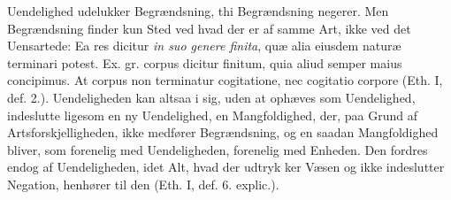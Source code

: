 \documentclass[12pt,a4paper]{book}
\newcommand{\opage}[1]{\marginnote{\footnotesize\textit{[#1]}}}
\begin{document}
Uendelighed udelukker Begrændsning, thi Begrændsning negerer. Men
Begrændsning finder kun Sted ved hvad der er af samme Art, ikke ved det
Uensartede: Ea res dicitur \emph{in suo genere finita}, quæ alia
eiusdem naturæ terminari potest. Ex. gr. corpus dicitur finitum, quia
aliud semper maius concipimus. At corpus non terminatur cogitatione,
nec cogitatio corpore (Eth. I, def. 2.). Uendeligheden kan altsaa i
sig, uden at ophæves som Uendelighed, indeslutte ligesom en ny
Uendelighed, en Mangfoldighed, der, paa Grund af Artsforskjelligheden,
ikke medfører Begrændsning, og en saadan Mangfoldighed bliver, som
forenelig med Uendeligheden, forenelig med Enheden. Den fordres endog
af Uendeligheden, idet Alt, hvad der udtryk\-%
\opage{47}\setcounter{footnote}{0}%
ker Væsen og ikke indeslutter Negation, henhører til den (Eth. I, def. 6.
explic.).
\end{document}

